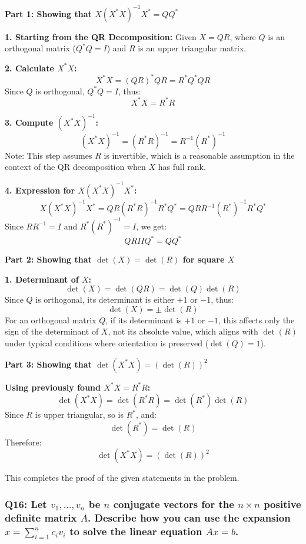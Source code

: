 \documentclass{article}
\begin{document}
\textbf{Part 1: Showing that \(X(X^* X)^{-1}X^* = QQ^*\)}

\textbf{1. Starting from the QR Decomposition:} Given \(X = QR\), where \(Q\) is an orthogonal matrix (\(Q^* Q = I\)) and \(R\) is an upper triangular matrix.

\textbf{2. Calculate \(X^* X\):}
   \[
   X^* X = (QR)^* QR = R^* Q^* QR
   \]
   Since \(Q\) is orthogonal, \(Q^* Q = I\), thus:
   \[
   X^* X = R^* R
   \]

\textbf{3. Compute \((X^* X)^{-1}\):}
   \[
   (X^* X)^{-1} = (R^* R)^{-1} = R^{-1} (R^*)^{-1}
   \]
   Note: This step assumes \(R\) is invertible, which is a reasonable assumption in the context of the QR decomposition when \(X\) has full rank.

\textbf{4. Expression for \(X(X^* X)^{-1}X^*\):}
   \[
   X(X^* X)^{-1}X^* = QR (R^* R)^{-1} R^* Q^* = QR R^{-1} (R^*)^{-1} R^* Q^*
   \]
   Since \(RR^{-1} = I\) and \(R^*(R^*)^{-1} = I\), we get:
   \[
   QR I I Q^* = QQ^*
   \]

\textbf{Part 2: Showing that \(\det(X) = \det(R)\) for square \(X\)}

\textbf{1. Determinant of \(X\):}
   \[
   \det(X) = \det(QR) = \det(Q) \det(R)
   \]
   Since \(Q\) is orthogonal, its determinant is either \(+1\) or \(-1\), thus:
   \[
   \det(X) = \pm \det(R)
   \]
   For an orthogonal matrix \(Q\), if its determinant is \(+1\) or \(-1\), this affects only the sign of the determinant of \(X\), not its absolute value, which aligns with \(\det(R)\) under typical conditions where orientation is preserved (\(\det(Q) = 1\)).

\textbf{Part 3: Showing that \(\det(X^* X) = (\det(R))^2\)}

\textbf{Using previously found \(X^* X = R^* R\):}
   \[
   \det(X^* X) = \det(R^* R) = \det(R^*) \det(R)
   \]
   Since \(R\) is upper triangular, so is \(R^*\), and:
   \[
   \det(R^*) = \det(R)
   \]
   Therefore:
   \[
   \det(X^* X) = (\det(R))^2
   \]

This completes the proof of the given statements in the problem.

\subsubsection*{Q16: Let \(v_1, \ldots, v_n\) be \(n\) conjugate vectors for the \(n \times n\) positive definite matrix \(A\). Describe how you can use the expansion \(x = \sum_{i=1}^n c_i v_i\) to solve the linear equation \(Ax = b\).}
\end{document}
